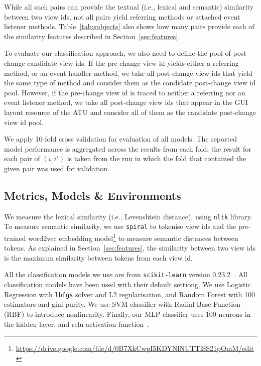 \documentclass[sigconf]{acmart}
\begin{document}
While all such pairs can provide the textual (i.e., lexical and semantic) 
similarity between two view ids, not all pairs yield referring methods or 
attached event listener methods. Table~\ref{tab:subjects} also shows how many 
pairs provide each of the similarity features described in 
Section~\ref{sec:features}. 

To evaluate our classification approach, we also need to define the pool of 
post-change candidate view ids. If the pre-change view id yields either a 
referring method, or an event handler method, we take all post-change view ids 
that yield the same type of method and consider them as the candidate 
post-change view id pool. However, if the pre-change view id is traced to 
neither a referring nor an event listener method, we take all post-change view 
ids that appear in the GUI layout resource of the ATU and consider all of them 
as the candidate post-change view id pool.

We apply 10-fold cross validation for evaluation of all models. The reported 
model performance is aggregated across the results from each fold: the result 
for each pair of $(i, i')$ is taken from the run in which the fold that 
contained the given pair was used for validation.

\subsection{Metrics, Models \& Environments}
\label{sec:models}

We measure the lexical similarity (i.e., Levenshtein distance), using
\texttt{nltk} library\cite{Bird2009hs}. To measure semantic similarity, we use \texttt{spiral}\cite{Hucka2018} to tokenise view
ids and the pre-trained word2vec embedding model\footnote{\url{https://drive.google.com/file/d/0B7XkCwpI5KDYNlNUTTlSS21pQmM/edit}} to measure semantic
distances between tokens. As explained in Section~\ref{sec:features}, the
similarity between two view ids is the maximum similarity between tokens from
each view id.

All the classification models we use are from \texttt{scikit-learn} version 
0.23.2~\cite{Pedregosa2011fu}. All classification models have been used with 
their default settiong. We use Logistic Regression with \texttt{lbfgs} solver 
and L2 regularisation, and Random Forest with 100 estimators and gini purity. 
We use SVM classifier with Radial Base Function (RBF) to introduce 
nonlinearity. Finally, our MLP classifier uses 100 neurons in the hidden layer, and relu activation function~\cite{Nair2010ts}. 
\end{document}
